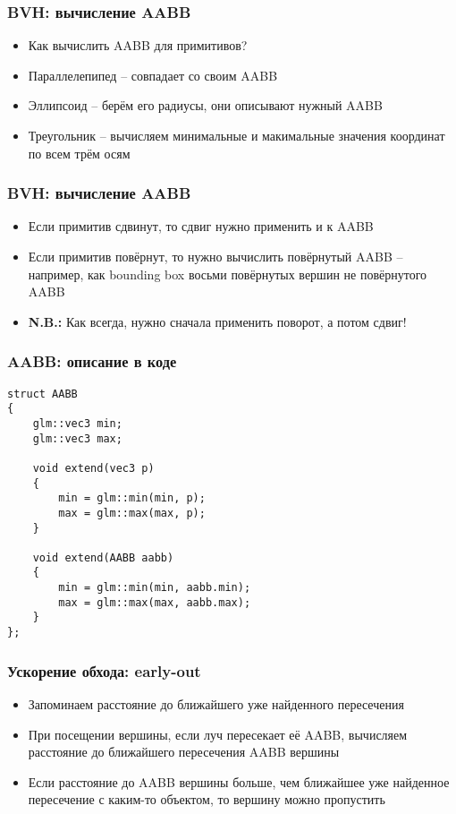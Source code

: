 \documentclass[10pt]{beamer}
\begin{document}
\begin{frame}[fragile]
\frametitle{BVH: вычисление AABB}
\begin{itemize}
\item Как вычислить AABB для примитивов?
\pause
\item Параллелепипед -- совпадает со своим AABB
\pause
\item Эллипсоид -- берём его радиусы, они описывают нужный AABB
\pause
\item Треугольник -- вычисляем минимальные и макимальные значения координат по всем трём осям
\end{itemize}
\end{frame}

\begin{frame}[fragile]
\frametitle{BVH: вычисление AABB}
\begin{itemize}
\item Если примитив сдвинут, то сдвиг нужно применить и к AABB
\pause
\item Если примитив повёрнут, то нужно вычислить повёрнутый AABB -- например, как bounding box восьми повёрнутых вершин не повёрнутого AABB
\pause
\item \textbf{\alert{N.B.:}} Как всегда, нужно сначала применить поворот, а потом сдвиг!
\end{itemize}
\end{frame}

\begin{frame}[fragile]
\frametitle{AABB: описание в коде}
\begin{verbatim}
struct AABB
{
    glm::vec3 min;
    glm::vec3 max;

    void extend(vec3 p)
    {
        min = glm::min(min, p);
        max = glm::max(max, p);
    }

    void extend(AABB aabb)
    {
        min = glm::min(min, aabb.min);
        max = glm::max(max, aabb.max);
    }
};
\end{verbatim}
\end{frame}

\begin{frame}[fragile]
\frametitle{Ускорение обхода: early-out}
\begin{itemize}
\item Запоминаем расстояние до ближайшего уже найденного пересечения
\pause
\item При посещении вершины, если луч пересекает её AABB, вычисляем расстояние до ближайшего пересечения AABB вершины
\pause
\item Если расстояние до AABB вершины больше, чем ближайшее уже найденное пересечение с каким-то объектом, то вершину можно пропустить
\end{itemize}
\end{frame}
\end{document}
